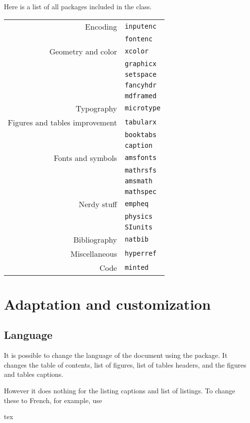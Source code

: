 \documentclass[a4paper, 11pt]{old-dms}
\begin{document}
{{Here is a list of all packages included in the class.

\begin{tabularx}{.5\textwidth}{rl}
    Encoding & \texttt{inputenc}\\
     & \texttt{fontenc}\\
    Geometry and color & \texttt{xcolor}\\
     & \texttt{graphicx}\\
     & \texttt{setspace}\\
     & \texttt{fancyhdr}\\
     & \texttt{mdframed}\\
    Typography & \texttt{microtype}\\
    Figures and tables improvement & \texttt{tabularx}\\
     & \texttt{booktabs}\\
     & \texttt{caption}\\
    Fonts and symbols & \texttt{amsfonts}\\
     & \texttt{mathrsfs}\\
     & \texttt{amsmath}\\
     & \texttt{mathspec}\\
    Nerdy stuff & \texttt{empheq}\\
    & \texttt{physics}\\
    & \texttt{SIunits}\\
    Bibliography & \texttt{natbib}\\
    Miscellaneous & \texttt{hyperref}\\
    Code & \texttt{minted}\\
\end{tabularx}


\section{Adaptation and customization}


\subsection{Language}

It is possible to change the language of the document using the  package. It changes the table of contents, list of figures, list of tables headers, and the figures and tables captions.

However it does nothing for the listing captions and list of listings. To change these to French, for example, use
\begin{codeboxnonos}{tex}
\renewcommand{\listingscaption}{Code source} %
\renewcommand{\listoflistingscaption}{Liste des codes sources} %
\end{codeboxnonos}


}}
\end{document}

